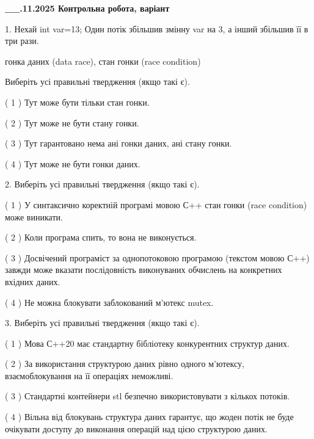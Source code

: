 \documentclass[12pt, ukrainian]{article}
\begin{document}
\newpage
\begin {large}

\textbf{\_\_.11.2025 Контрольна робота, варіант  }\par


{
1. Нехай int var=13; Один потік збільшив змінну var на 3, а інший збільшив її в три рази.

гонка даних (data race), стан гонки (race condition)

Виберіть усі правильні твердження (якщо такі є).\par
\vspace{2mm}
( 1 ) Тут може бути тільки стан гонки.%

( 2 ) Тут може не бути стану гонки.%

( 3 ) Тут гарантовано нема ані гонки даних, ані стану гонки.%

( 4 ) Тут може не бути гонки даних.%


2. Виберіть усі правильні твердження (якщо такі є).\par
\vspace{2mm}

( 1 ) У синтаксично коректній програмі мовою С++ стан гонки (race condition) може виникати.%

( 2 ) Коли програма спить, то вона не виконується.%

( 3 ) Досвічений програміст за однопотоковою програмою (текстом мовою С++) завжди може вказати послідовність виконуваних обчислень на конкретних вхідних даних.%

( 4 ) Не можна блокувати заблокований м’ютекс mutex.%


3. Виберіть усі правильні твердження (якщо такі є).\par
\vspace{2mm}

( 1 ) Мова С++20 має стандартну бібліотеку конкурентних структур даних.%

( 2 ) За використання структурою даних рівно одного м’ютексу, взаємоблокування на її операціях неможливі.%

( 3 ) Стандартні контейнери stl безпечно використовувати з кількох потоків.%

( 4 ) Вільна від блокувань структура даних гарантує, що жоден потік не буде очікувати доступу до виконання операцій над цією структурою даних.%


}
\end{large}
\end{document}

